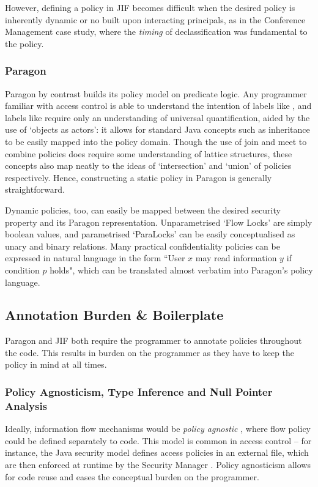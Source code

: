 However, defining a policy in JIF becomes difficult when the desired policy is inherently dynamic or no built upon interacting principals, as in the Conference Management case study, where the \textit{timing} of declassification was fundamental to the policy.

\subsubsection{Paragon}

Paragon by contrast builds its policy model on predicate logic. Any programmer familiar with access control is able to understand the intention of labels like , and labels like  require only an understanding of universal quantification, aided by the use of `objects as actors': it allows for standard Java concepts such as inheritance to be easily mapped into the policy domain. Though the use of join and meet to combine policies does require some understanding of lattice structures, these concepts also map neatly to the ideas of `intersection' and `union' of policies respectively. Hence, constructing a static policy in Paragon is generally straightforward.

Dynamic policies, too, can easily be mapped between the desired security property and its Paragon representation. Unparametrised `Flow Locks' are simply boolean values, and parametrised `ParaLocks' can be easily conceptualised as unary and binary relations. Many practical confidentiality policies can be expressed in natural language in the form ``User $ x $ may read information $ y $ if condition $ p $ holds", which can be translated almost verbatim into Paragon's policy language.

\subsection{Annotation Burden \& Boilerplate}

Paragon and JIF both require the programmer to annotate policies throughout the code. This results in burden on the programmer as they have to keep the policy in mind at all times.

\subsubsection{Policy Agnosticism, Type Inference and Null Pointer Analysis}

Ideally, information flow mechanisms would be \textit{policy agnostic} \cite{yang2012agnostic} \cite{austin2013agnostic}, where flow policy could be defined separately to code. This model is common in access control -- for instance, the Java security model defines access policies in an external file, which are then enforced at runtime by the Security Manager \cite{gong2003javasecurity}. Policy agnosticism allows for code reuse and eases the conceptual burden on the programmer.

